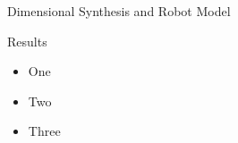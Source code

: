 \documentclass[c]{beamer}
\newcommand{\postersubsection}[1]{%
\setlength\fboxsep{0pt}%
\vfil\penalty125\vfilneg\vskip1.5ex
\colorbox{Grau}{\parbox[b]{\columnwidth}{\vskip0.75ex%
\Large\hskip1ex #1%
\vskip0.75ex}}%
}
\begin{document}
\begin{frame}
\begin{whiteblock}{Dimensional Synthesis and Robot Model}
{\begin{multicols}{2}
\end{multicols}}
\end{whiteblock}
\begin{block}{Results}
\parbox{\columnwidth}{
\begin{multicols}{2}
[]
\begin{itemize}
    \item One
    \item Two
    \item Three
\end{itemize}


\end{multicols}}
\end{block}
\end{frame}
\end{document}
